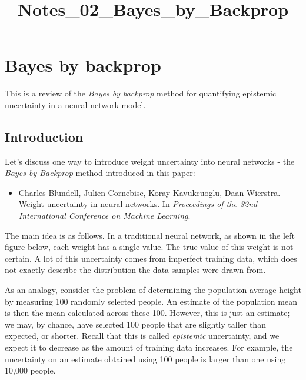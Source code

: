 \documentclass[11pt]{article}
\title{Notes\_02\_Bayes\_by\_Backprop}
\providecommand{\tightlist}{%
      \setlength{\itemsep}{0pt}\setlength{\parskip}{0pt}}
\begin{document}
    
    \maketitle
    
    

    
    \hypertarget{bayes-by-backprop}{%
\section{Bayes by backprop}\label{bayes-by-backprop}}

    This is a review of the \emph{Bayes by backprop} method for quantifying
epistemic uncertainty in a neural network model.

    \hypertarget{introduction}{%
\subsection{Introduction}\label{introduction}}

Let's discuss one way to introduce weight uncertainty into neural
networks - the \emph{Bayes by Backprop} method introduced in this paper:

\begin{itemize}
\tightlist
\item
  Charles Blundell, Julien Cornebise, Koray Kavukcuoglu, Daan Wierstra.
  \href{https://arxiv.org/pdf/1505.05424.pdf}{Weight uncertainty in
  neural networks}. In \emph{Proceedings of the 32nd International
  Conference on Machine Learning}.
\end{itemize}

The main idea is as follows. In a traditional neural network, as shown
in the left figure below, each weight has a single value. The true value
of this weight is not certain. A lot of this uncertainty comes from
imperfect training data, which does not exactly describe the
distribution the data samples were drawn from.

As an analogy, consider the problem of determining the population
average height by measuring 100 randomly selected people. An estimate of
the population mean is then the mean calculated across these 100.
However, this is just an estimate; we may, by chance, have selected 100
people that are slightly taller than expected, or shorter. Recall that
this is called \emph{epistemic} uncertainty, and we expect it to
decrease as the amount of training data increases. For example, the
uncertainty on an estimate obtained using 100 people is larger than one
using 10,000 people.
\end{document}
